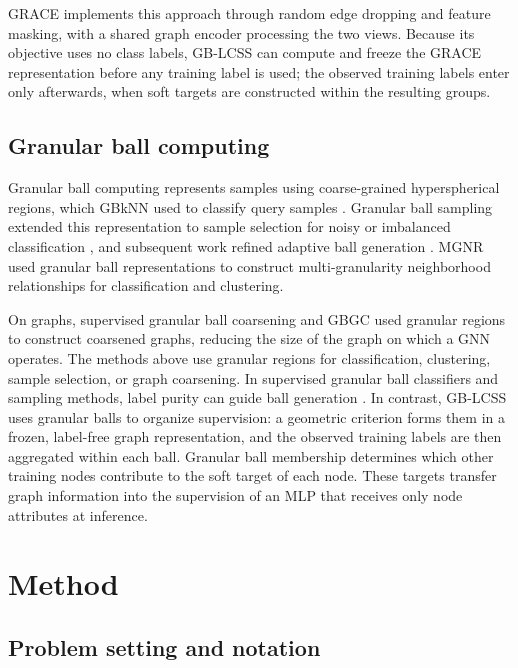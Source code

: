 \documentclass[10pt,letterpaper,nopreprintline]{elsarticle}
\theoremstyle{definition}
\theoremstyle{plain}
\begin{document}
GRACE \cite{ref12} implements this approach through random edge dropping and feature masking, with a shared graph encoder processing the two views. Because its objective uses no class labels, GB-LCSS can compute and freeze the GRACE representation before any training label is used; the observed training labels enter only afterwards, when soft targets are constructed within the resulting groups.

\subsection{Granular ball computing}\label{sec:2.5}

Granular ball computing represents samples using coarse-grained hyperspherical regions, which GBkNN used to classify query samples \cite{ref13}. Granular ball sampling extended this representation to sample selection for noisy or imbalanced classification \cite{ref15}, and subsequent work refined adaptive ball generation \cite{ref16}. MGNR \cite{ref58} used granular ball representations to construct multi-granularity neighborhood relationships for classification and clustering.

On graphs, supervised granular ball coarsening \cite{ref66} and GBGC \cite{ref67} used granular regions to construct coarsened graphs, reducing the size of the graph on which a GNN operates. The methods above use granular regions for classification, clustering, sample selection, or graph coarsening. In supervised granular ball classifiers and sampling methods, label purity can guide ball generation \cite{ref13,ref15,ref16}. In contrast, GB-LCSS uses granular balls to organize supervision: a geometric criterion forms them in a frozen, label-free graph representation, and the observed training labels are then aggregated within each ball. Granular ball membership determines which other training nodes contribute to the soft target of each node. These targets transfer graph information into the supervision of an MLP that receives only node attributes at inference.

\FloatBarrier

\section{Method}\label{sec:3}

\subsection{Problem setting and notation}\label{sec:3.1}
\end{document}
